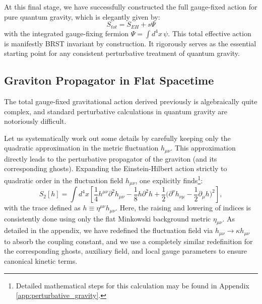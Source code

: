 At this final stage, we have successfully constructed the full gauge-fixed action for pure quantum gravity, which is elegantly given by:
\begin{equation} \label{eq:total_action_gravity}
    S_{tot} = S_{EH} + s\Psi
\end{equation}
with the integrated gauge-fixing fermion \(\Psi = \int d^4x \, \psi\). This total effective action is manifestly BRST invariant by construction. It rigorously serves as the essential starting point for any consistent perturbative treatment of quantum gravity.

\subsection{Graviton Propagator in Flat Spacetime}

The total gauge-fixed gravitational action derived previously is algebraically quite complex, and standard perturbative calculations in quantum gravity are notoriously difficult.

Let us systematically work out some details by carefully keeping only the quadratic approximation in the metric fluctuation \(h_{\mu\nu}\). This approximation directly leads to the perturbative propagator of the graviton (and its corresponding ghosts). Expanding the Einstein-Hilbert action strictly to quadratic order in the fluctuation field \(h_{\mu\nu}\), one explicitly finds\footnote{Detailed mathematical steps for this calculation may be found in Appendix \ref{app:perturbative_gravity}.}:
\begin{equation} \label{eq:action_quadratic}
    S_2[h] = \int d^4x \left[ \frac{1}{4} h^{\mu\nu}\partial^2 h_{\mu\nu} - \frac{1}{8} h\partial^2 h + \frac{1}{2} \Big( \partial^\nu h_{\nu\mu} - \frac{1}{2} \partial_\mu h \Big)^2 \right],
\end{equation}
with the trace defined as \(h \equiv \eta^{\mu\nu}h_{\mu\nu}\). Here, the raising and lowering of indices is consistently done using only the flat Minkowski background metric \(\eta_{\mu\nu}\). As detailed in the appendix, we have redefined the fluctuation field via \(h_{\mu\nu} \rightarrow \kappa h_{\mu\nu}\) to absorb the coupling constant, and we use a completely similar redefinition for the corresponding ghosts, auxiliary field, and local gauge parameters to ensure canonical kinetic terms.

